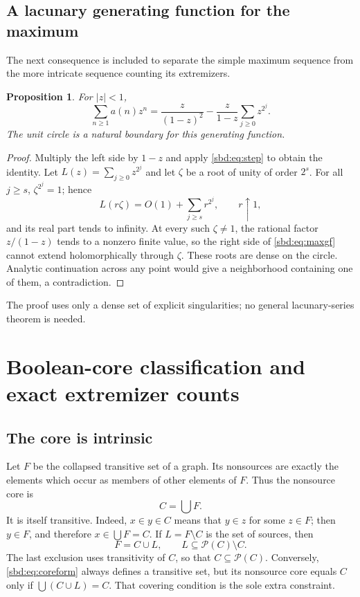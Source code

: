 \documentclass[11pt,a4paper]{article}
\newtheorem{proposition}[theorem]{Proposition}
\theoremstyle{definition}
\newcommand{\PP}{\mathcal P}
\begin{document}
\subsection{A lacunary generating function for the maximum}
The next consequence is included to separate the simple maximum sequence
from the more intricate sequence counting its extremizers.

\begin{proposition}\label{sbd:prop:maxgf}
For $|z|<1$,
\begin{equation}\label{sbd:eq:maxgf}
 \sum_{n\ge1}a(n)z^n
 =\frac{z}{(1-z)^2}-\frac{z}{1-z}\sum_{j\ge0}z^{2^j}.
\end{equation}
The unit circle is a natural boundary for this generating function.
\end{proposition}
\begin{proof}
Multiply the left side by $1-z$ and apply \eqref{sbd:eq:step} to obtain the
identity. Let $L(z)=\sum_{j\ge0}z^{2^j}$ and let $\zeta$ be a root of unity
of order $2^s$. For all $j\ge s$, $\zeta^{2^j}=1$; hence
\[
 L(r\zeta)=O(1)+\sum_{j\ge s}r^{2^j},\qquad r\uparrow1,
\]
and its real part tends to infinity. At every such $\zeta\ne1$, the
rational factor $z/(1-z)$ tends to a nonzero finite value, so the right
side of \eqref{sbd:eq:maxgf} cannot extend holomorphically through $\zeta$.
These roots are dense on the circle. Analytic continuation across any
point would give a neighborhood containing one of them, a contradiction.
\end{proof}
The proof uses only a dense set of explicit singularities; no general
lacunary-series theorem is needed.

\section{Boolean-core classification and exact extremizer counts}

\subsection{The core is intrinsic}
Let $F$ be the collapsed transitive set of a graph. Its nonsources are
exactly the elements which occur as members of other elements of $F$.
Thus the nonsource core is
\begin{equation}\label{sbd:eq:union-core}
 C=\bigcup F.
\end{equation}
It is itself transitive. Indeed, $x\in y\in C$ means that $y\in z$ for
some $z\in F$; then $y\in F$, and therefore $x\in\bigcup F=C$.
If $L=F\setminus C$ is the set of sources, then
\begin{equation}\label{sbd:eq:coreform}
 F=C\cup L,\qquad L\subseteq\PP(C)\setminus C.
\end{equation}
The last exclusion uses transitivity of $C$, so that $C\subseteq\PP(C)$.
Conversely, \eqref{sbd:eq:coreform} always defines a transitive set, but its
nonsource core equals $C$ only if $\bigcup(C\cup L)=C$.
That covering condition is the sole extra constraint.
\end{document}
